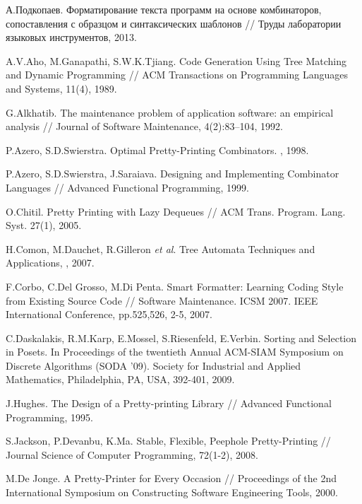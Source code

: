 \begin{thebibliography}{9001}

 А.Подкопаев. Форматирование текста программ на основе комбинаторов, сопоставления с образцом и синтаксических шаблонов
// Труды лаборатории языковых инструментов, 2013.


 A.V.Aho, M.Ganapathi, S.W.K.Tjiang. Code Generation Using Tree Matching and Dynamic Programming // ACM Transactions on Programming Languages and Systems, 
11(4), 1989.


 G.Alkhatib. The maintenance problem of application software:
an empirical analysis // Journal of Software Maintenance, 4(2):83–104, 1992.

 P.Azero, S.D.Swierstra. Optimal Pretty-Printing Combinators. , 1998.

 P.Azero, S.D.Swierstra, J.Saraiava. Designing and Implementing Combinator Languages // Advanced Functional Programming, 1999.

 O.Chitil. Pretty Printing with Lazy Dequeues // ACM Trans. Program. Lang. Syst. 27(1), 2005.

 H.Comon, M.Dauchet, R.Gilleron \emph{et al}. Tree Automata Techniques and Applications, , 2007.

 F.Corbo, C.Del Grosso, M.Di Penta. Smart Formatter: Learning Coding Style from
Existing Source Code // Software Maintenance. ICSM 2007. IEEE International Conference, pp.525,526, 2-5, 2007.

 C.Daskalakis, R.M.Karp, E.Mossel, S.Riesenfeld, E.Verbin.
Sorting and Selection in Posets.
In Proceedings of the twentieth Annual ACM-SIAM Symposium on Discrete
Algorithms (SODA '09). Society for Industrial and Applied Mathematics, Philadelphia, PA, USA, 392-401, 2009.

 J.Hughes. The Design of a Pretty-printing Library // Advanced Functional Programming, 1995.

 S.Jackson, P.Devanbu, K.Ma. Stable, Flexible, Peephole Pretty-Printing // Journal Science of Computer Programming, 72(1-2), 2008.

 M.De Jonge. A Pretty-Printer for Every Occasion // Proceedings of the 2nd International Symposium on Constructing 
Software Engineering Tools, 2000.


\end{thebibliography}
